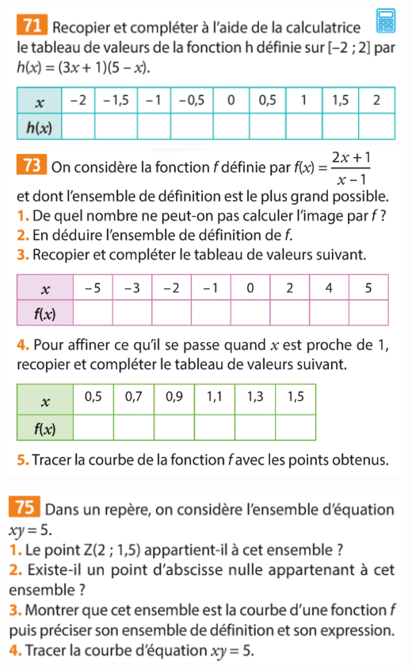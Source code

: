 \documentclass{article}
\begin{document}
\begin{minipage}{0.45\textwidth}
\includegraphics[width=\textwidth]{Exercice_4.png}
\includegraphics[width=\textwidth]{Exercice_5.png}
\end{minipage}
\hfill\vline\hfill
\begin{minipage}{0.45\textwidth}
\includegraphics[width=\textwidth]{Exercice_6.png}
\end{minipage}
\end{document}
